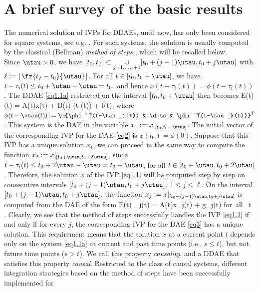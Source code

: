 \documentclass[final,reqno]{siamltex}
\begin{document}
\section{A brief survey of the basic results}
%
The numerical solution of IVPs for DDAEs, until now, has only been considered for square systems, see e.g. 
\cite{AscP95,BakPT02,CamL09,GugH07,Liu99,ShaG06,TiaYK11,ZhuP97,ZhuP98}. 
For such systems, the solution is usually computed by the classical (Bellman) \emph{method of steps} \cite{Bel61,BelC63,BelC65}, which will be recalled below.\\
Since $\utau>0$, we have $[t_0,t_f] \subset \underset{j=1,\dots,\ell+1}{\cup} [t_0+(j-1)\utau,t_0+j\utau]$ 
with $\ell := \lfloor \fr{t_f-t_0}{\utau} \rfloor$.
For all $t \in [t_0,t_0+\utau]$, we have $t-\tau_i(t) \leq t_0 + \utau - \utau = t_0,$ and hence $x(t-\tau_i(t)) = \phi(t-\tau_i(t))$.
The DDAE \eqref{eq1.1a} restricted on the interval $[t_0,t_0+\utau]$ then becomes
%
\be\label{eq2}
 E(t)(t) = A(t)x(t) + B(t) \phi(t-\vtau(t)) + f(t),
\ee
%
where $\phi(t-\vtau(t)) := \m{\phi^T(t-\tau_1(t)) & \dots & \phi^T(t-\tau_k(t))}^T$. 
This system is the DAE in the variable $x_1 := x|_{[t_0,t_0+\utau]}$. The initial vector of the corresponding IVP for the DAE \eqref{eq2} is $x(t_0)=\phi(0)$.
Suppose that this IVP has a unique solution $x_1$, we can proceed in the same way to compute the function $x_2 := x|_{[t_0+\utau,t_0+2\utau]}$, since 
$t-\tau_i(t) \leq t_0 + 2 \utau - \utau = t_0+\utau$, for all $t\in [t_0+\utau,t_0+2\utau]$. Therefore, the solution $x$ of the IVP \eqref{eq1.1} will be 
computed step by step on consecutive intervals $[t_0+(j-1)\utau,t_0+j\utau]$, $1\leq j\leq \ell$. 
On the interval $[t_0+(j-1)\utau,t_0+j\utau]$, the function $x_j := x|_{[t_0+(j-1)\utau,t_0+j\utau]}$ is computed from the DAE of the form
%
\be\label{eq3}
 E(t) _j(t) = A(t)x_j(t) + g_j(t) \quad \mbox{for all } t .
\ee
%
Clearly, we see that the method of steps successfully handles the IVP \eqref{eq1.1} if and only if for every $j$, the corresponding IVP for the 
DAE \eqref{eq3} has a unique solution.
This requirement means that the solution $x$ at a current point $t$ depends only on the system \eqref{eq1.1a} 
at current and past time points (i.e., $s \leq t$), but not future time points ($s > t$). We call this property \emph{causality}, and 
a DDAE that satisfies this property \emph{causal}. 
Restricted to the class of causal systems, different integration strategies based on the method of steps have been successfully implemented for 
\end{document}
